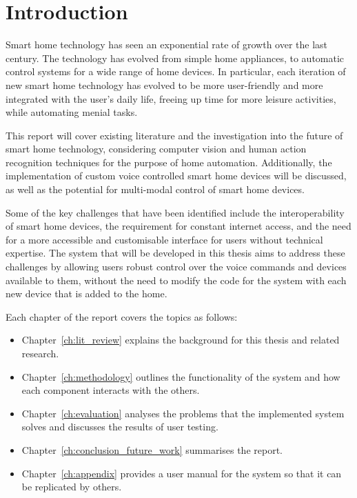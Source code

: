 \chapter{Introduction}\label{ch:intro}

Smart home technology has seen an exponential rate of growth over the last century.
The technology has evolved from simple home appliances, to automatic control systems for a wide range of home devices.
In particular, each iteration of new smart home technology has evolved to be more user-friendly and more integrated with the user's daily life, freeing up time for more leisure activities, while automating menial tasks.

This report will cover existing literature and the investigation into the future of smart home technology, considering computer vision and human action recognition techniques for the purpose of home automation.
Additionally, the implementation of custom voice controlled smart home devices will be discussed, as well as the potential for multi-modal control of smart home devices.

Some of the key challenges that have been identified include the interoperability of smart home devices, the requirement for constant internet access, and the need for a more accessible and customisable interface for users without technical expertise.
The system that will be developed in this thesis aims to address these challenges by allowing users robust control over the voice commands and devices available to them, without the need to modify the code for the system with each new device that is added to the home.

\newpage

Each chapter of the report covers the topics as follows:
\begin{itemize}
    \item Chapter~\ref{ch:lit_review} explains the background for this thesis and related research.
    \item Chapter~\ref{ch:methodology} outlines the functionality of the system and how each component interacts with the others.
    \item Chapter~\ref{ch:evaluation} analyses the problems that the implemented system solves and discusses the results of user testing.
    \item Chapter~\ref{ch:conclusion_future_work} summarises the report.
    \item Chapter~\ref{ch:appendix} provides a user manual for the system so that it can be replicated by others.
\end{itemize}
